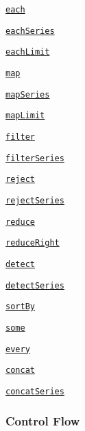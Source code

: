 \begin{DoxyItemize}
\item \href{#each}{\tt each}
\item \href{#eachSeries}{\tt each\+Series}
\item \href{#eachLimit}{\tt each\+Limit}
\item \href{#map}{\tt map}
\item \href{#mapSeries}{\tt map\+Series}
\item \href{#mapLimit}{\tt map\+Limit}
\item \href{#filter}{\tt filter}
\item \href{#filterSeries}{\tt filter\+Series}
\item \href{#reject}{\tt reject}
\item \href{#rejectSeries}{\tt reject\+Series}
\item \href{#reduce}{\tt reduce}
\item \href{#reduceRight}{\tt reduce\+Right}
\item \href{#detect}{\tt detect}
\item \href{#detectSeries}{\tt detect\+Series}
\item \href{#sortBy}{\tt sort\+By}
\item \href{#some}{\tt some}
\item \href{#every}{\tt every}
\item \href{#concat}{\tt concat}
\item \href{#concatSeries}{\tt concat\+Series}
\end{DoxyItemize}

\subsubsection*{Control Flow}


